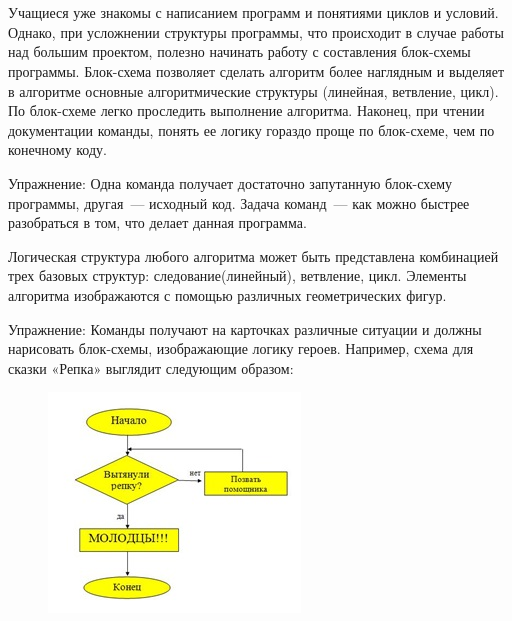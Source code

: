 {\hypertarget{lesson28x2}{}}\\\\

Учащиеся уже знакомы с написанием программ и понятиями циклов и условий. Однако, при усложнении структуры программы, что происходит в случае работы над большим проектом, полезно начинать работу с составления блок-схемы программы. Блок-схема позволяет сделать алгоритм более наглядным и выделяет в алгоритме основные алгоритмические структуры (линейная, ветвление, цикл). По блок-схеме легко проследить выполнение алгоритма.  Наконец, при чтении документации команды, понять ее логику гораздо проще по блок-схеме, чем по конечному коду.

Упражнение: Одна команда получает достаточно запутанную блок-схему программы, другая~--- исходный код. Задача команд~--- как можно быстрее  разобраться в том, что делает данная программа.

Логическая структура любого алгоритма может быть представлена комбинацией трех базовых структур: следование(линейный), ветвление, цикл. Элементы алгоритма изображаются с помощью различных геометрических фигур.

Упражнение: Команды получают на карточках различные ситуации и должны нарисовать блок-схемы, изображающие логику героев. Например, схема для сказки «Репка» выглядит следующим образом:

\begin{figure}[h!]
	\begin{center}
		\includegraphics[width=0.63\linewidth]{chapters/chapter28/images/1}
		\caption{}
		\label{ris:image28x1}
	\end{center}
\end{figure}


{\hypertarget{lesson28x3}{}}\\\\	


